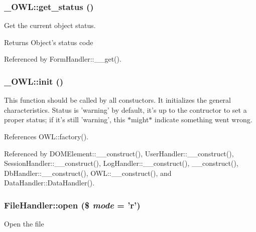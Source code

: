 \subsubsection[{get\_\-status}]{\setlength{\rightskip}{0pt plus 5cm}\_\-OWL::get\_\-status ()}\label{class__OWL_a99ec771fa2c5c279f80152cc09e489a8}
Get the current object status.

\begin{DoxyReturn}{Returns}
Object's status code 
\end{DoxyReturn}


Referenced by FormHandler::\_\-\_\-get().

\subsubsection[{init}]{\setlength{\rightskip}{0pt plus 5cm}\_\-OWL::init ()}\label{class__OWL_ae0ef3ded56e8a6b34b6461e5a721cd3e}
This function should be called by all constuctors. It initializes the general characteristics. Status is 'warning' by default, it's up to the contructor to set a proper status; if it's still 'warning', this $\ast$might$\ast$ indicate something went wrong. 

References OWL::factory().



Referenced by DOMElement::\_\-\_\-construct(), UserHandler::\_\-\_\-construct(), SessionHandler::\_\-\_\-construct(), LogHandler::\_\-\_\-construct(), \_\-\_\-construct(), DbHandler::\_\-\_\-construct(), OWL::\_\-\_\-construct(), and DataHandler::DataHandler().

\subsubsection[{open}]{\setlength{\rightskip}{0pt plus 5cm}FileHandler::open (\$ {\em mode} = {\ttfamily 'r'})}\label{classFileHandler_a2a650b033c4eb1f98ba47fb05ce7b454}
Open the file


